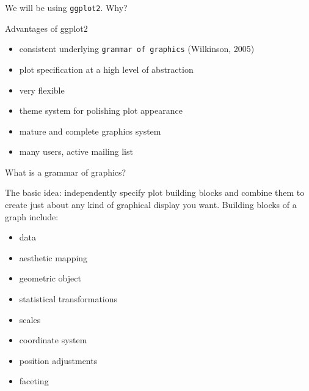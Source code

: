 \documentclass[
  ignorenonframetext,
]{beamer}
\providecommand{\tightlist}{%
  \setlength{\itemsep}{0pt}\setlength{\parskip}{0pt}}
\begin{document}
\begin{frame}[fragile]{We will be using \texttt{ggplot2}. Why?}
\protect\hypertarget{we-will-be-using-ggplot2.-why}{}

Advantages of ggplot2

\begin{itemize}
\tightlist
\item
  consistent underlying \texttt{grammar\ of\ graphics} (Wilkinson, 2005)
\item
  plot specification at a high level of abstraction
\item
  very flexible
\item
  theme system for polishing plot appearance
\item
  mature and complete graphics system
\item
  many users, active mailing list
\end{itemize}

\end{frame}

\begin{frame}{What is a grammar of graphics?}
\protect\hypertarget{what-is-a-grammar-of-graphics}{}

The basic idea: independently specify plot building blocks and combine
them to create just about any kind of graphical display you want.
Building blocks of a graph include:

\begin{itemize}
\tightlist
\item
  data
\item
  aesthetic mapping
\item
  geometric object
\item
  statistical transformations
\item
  scales
\item
  coordinate system
\item
  position adjustments
\item
  faceting
\end{itemize}

\end{frame}
\end{document}
